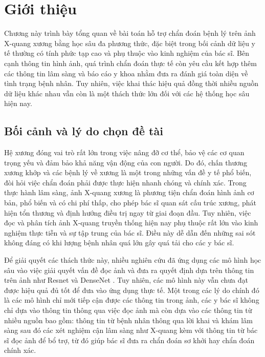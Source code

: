\chapter{Giới thiệu}
\label{Chapter1}

Chương này trình bày tổng quan về bài toán hỗ trợ chẩn đoán bệnh lý trên ảnh X-quang xương bằng học sâu đa phương thức, đặc biệt trong bối cảnh dữ liệu y tế thường có tính phức tạp cao và phụ thuộc vào kinh nghiệm của bác sĩ. Bên cạnh thông tin hình ảnh, quá trình chẩn đoán thực tế còn yêu cầu kết hợp thêm các thông tin lâm sàng và báo cáo y khoa nhằm đưa ra đánh giá toàn diện về tình trạng bệnh nhân. Tuy nhiên, việc khai thác hiệu quả đồng thời nhiều nguồn dữ liệu khác nhau vẫn còn là một thách thức lớn đối với các hệ thống học sâu hiện nay.


\section{Bối cảnh và lý do chọn đề tài}

Hệ xương đóng vai trò rất lớn trong việc nâng đỡ cơ thể, bảo vệ các cơ quan trọng yếu và đảm bảo khả năng vận động của con người. Do đó, chấn thương xương khớp và các bệnh lý về xương là một trong những vấn đề y tế phổ biến, đòi hỏi việc chẩn đoán phải được thực hiện nhanh chóng và chính xác. Trong thực hành lâm sàng, ảnh X-quang xương là phương tiện chẩn đoán hình ảnh cơ bản, phổ biến và có chi phí thấp, cho phép bác sĩ quan sát cấu trúc xương, phát hiện tổn thương và định hướng điều trị ngay từ giai đoạn đầu. Tuy nhiên, việc đọc và phân tích ảnh X-quang truyền thống hiện nay phụ thuộc rất lớn vào kinh nghiệm thực tiễn và sự tập trung của bác sĩ. Điều này dễ dẫn đến những sai sót không đáng có khi lượng bệnh nhân quá lớn gây quá tải cho các y bác sĩ.

Để giải quyết các thách thức này, nhiều nghiên cứu đã ứng dụng các mô hình học sâu vào việc giải quyết vấn đề đọc ảnh và đưa ra quyết định dựa trên thông tin trên ảnh như Resnet \cite{ResNet} và DenseNet \cite{DenseNet}. Tuy nhiên, các mô hình này vẫn chưa đạt được hiệu quả đủ tốt để đưa vào ứng dụng thực tế. Một trong các lý do chính đó là các mô hình chỉ mới tiếp cận được các thông tin trong ảnh, các y bác sĩ không chỉ dựa vào thông tin thông qua việc đọc ảnh mà còn dựa vào các thông tin từ nhiều nguồn bao gồm: thông tin từ bệnh nhân thông qua lời khai và khám lâm sàng sau đó các xét nghiệm cận lâm sàng như X-quang kèm với thông tin từ bác sĩ đọc ảnh để bổ trợ, từ đó giúp bác sĩ đưa ra chẩn đoán sơ khởi hay chẩn đoán chính xác. 

